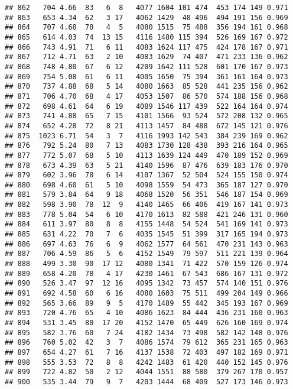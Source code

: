 \documentclass[]{article}
\begin{document}
\begin{verbatim}
## 862   704 4.66  83   6  8   4077 1604 101 474  453 174 149 0.971
## 863   653 4.34  62   3 17   4062 1429  48 496  494 191 156 0.969
## 864   707 4.68  78   4  5   4080 1515  75 488  356 194 161 0.968
## 865   614 4.03  74  13 15   4116 1480 115 394  526 169 167 0.972
## 866   743 4.91  71   6 11   4083 1624 117 475  424 178 167 0.971
## 867   712 4.71  63   2 10   4083 1629  74 407  471 233 136 0.962
## 868   748 4.80  67   6 12   4209 1642 111 528  601 170 167 0.973
## 869   754 5.08  61   6 11   4005 1650  75 394  361 161 164 0.973
## 870   737 4.88  68   5 14   4080 1663  85 528  441 235 156 0.962
## 871   706 4.70  68   4 17   4053 1507  86 570  574 188 156 0.968
## 872   698 4.61  64   6 19   4089 1546 117 439  522 164 164 0.974
## 873   741 4.88  65   7 15   4101 1566  93 524  572 208 132 0.965
## 874   652 4.28  72   8 21   4113 1457  84 488  672 145 121 0.976
## 875  1023 6.71  54   3  7   4116 1993 142 543  384 239 169 0.962
## 876   792 5.24  80   7 13   4083 1730 128 438  393 216 164 0.965
## 877   772 5.07  68   5 10   4113 1639 124 449  470 189 152 0.969
## 878   673 4.39  63   5 21   4140 1596  87 476  639 183 176 0.970
## 879   602 3.96  78   6 14   4107 1367  52 504  524 155 150 0.974
## 880   698 4.60  61   5 10   4098 1559  54 473  365 187 127 0.970
## 881   579 3.84  64   9 18   4068 1520  56 351  546 187 154 0.969
## 882   598 3.90  78  12  9   4140 1465  66 406  419 167 141 0.973
## 883   778 5.04  54   6 10   4170 1613  82 588  421 246 131 0.960
## 884   611 3.97  80   8  8   4155 1448  54 524  541 169 141 0.973
## 885   631 4.22  70   7  6   4035 1545  51 399  317 165 194 0.973
## 886   697 4.63  76   6  9   4062 1577  64 561  470 231 143 0.963
## 887   706 4.59  86   5  6   4152 1549  79 597  511 221 139 0.964
## 888   499 3.30  90  17 12   4080 1341  71 422  570 159 126 0.974
## 889   658 4.20  78   4 17   4230 1461  67 543  686 167 131 0.972
## 890   526 3.47  97  12 16   4095 1342  73 457  574 140 151 0.976
## 891   692 4.58  60   6 16   4080 1603  75 511  499 204 149 0.966
## 892   565 3.66  89   9  5   4170 1489  55 442  345 193 167 0.969
## 893   720 4.76  65   4 10   4086 1623  84 444  436 231 160 0.963
## 894   531 3.45  80  17 20   4152 1470  65 449  626 160 169 0.974
## 895   582 3.76  60   7 24   4182 1434  73 498  582 142 148 0.976
## 896   760 5.02  42   3  7   4086 1574  79 612  365 231 165 0.963
## 897   654 4.27  61   7 16   4137 1538  72 403  497 182 169 0.971
## 898   555 3.53  72   8  8   4242 1483  61 420  440 152 145 0.976
## 899   722 4.82  50   2 12   4044 1551  88 580  379 267 170 0.957
## 900   535 3.44  79   9  7   4203 1444  68 409  527 173 146 0.973

\end{verbatim}
\end{document}
